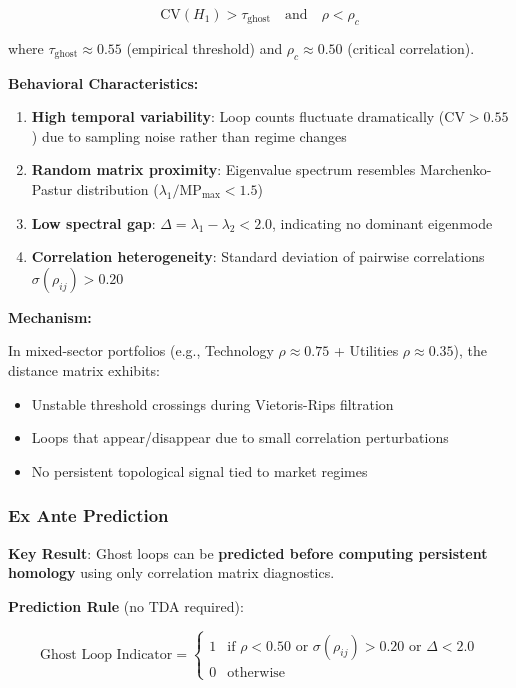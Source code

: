 \begin{equation}
\text{CV}(H_1) > \tau_{\text{ghost}} \quad \text{and} \quad \rho < \rho_c
\end{equation}

where $\tau_{\text{ghost}} \approx 0.55$ (empirical threshold) and $\rho_c \approx 0.50$ (critical correlation).

\textbf{Behavioral Characteristics:}

\begin{enumerate}
\item \textbf{High temporal variability}: Loop counts fluctuate dramatically ($\text{CV} > 0.55$) due to sampling noise rather than regime changes

\item \textbf{Random matrix proximity}: Eigenvalue spectrum resembles Marchenko-Pastur distribution ($\lambda_1 / \text{MP}_{\max} < 1.5$)

\item \textbf{Low spectral gap}: $\Delta = \lambda_1 - \lambda_2 < 2.0$, indicating no dominant eigenmode

\item \textbf{Correlation heterogeneity}: Standard deviation of pairwise correlations $\sigma(\rho_{ij}) > 0.20$
\end{enumerate}

\textbf{Mechanism:}

In mixed-sector portfolios (e.g., Technology $\rho \approx 0.75$ + Utilities $\rho \approx 0.35$), the distance matrix exhibits:
\begin{itemize}
\item Unstable threshold crossings during Vietoris-Rips filtration
\item Loops that appear/disappear due to small correlation perturbations
\item No persistent topological signal tied to market regimes
\end{itemize}

\subsubsection{Ex Ante Prediction}

\textbf{Key Result}: Ghost loops can be \textbf{predicted before computing persistent homology} using only correlation matrix diagnostics.

\textbf{Prediction Rule} (no TDA required):

\begin{equation}
\text{Ghost Loop Indicator} =
\begin{cases}
1 & \text{if } \rho < 0.50 \text{ or } \sigma(\rho_{ij}) > 0.20 \text{ or } \Delta < 2.0 \\
0 & \text{otherwise}
\end{cases}
\end{equation}

